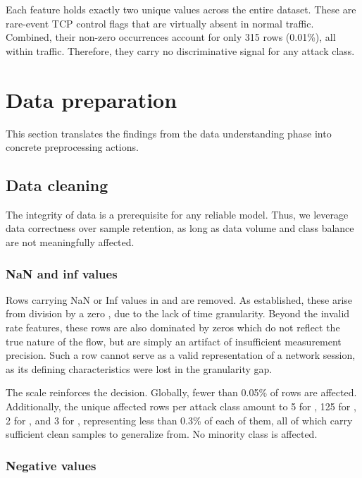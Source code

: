 Each feature holds exactly two unique values across the entire dataset. These are rare-event TCP control flags that are virtually absent in normal traffic. Combined, their non-zero occurrences account for only 315 rows (0.01\%), all within  traffic. Therefore, they carry no discriminative signal for any attack class.
\vspace{-0.5cm}
\section{Data preparation}
\vspace{-0.3cm}
This section translates the findings from the data understanding phase into concrete preprocessing actions.

\vspace{-0.5cm}
\subsection{Data cleaning}
\vspace{-0.3cm}
The integrity of data is a prerequisite for any reliable model. Thus, we leverage data correctness over sample retention, as long as data volume and class balance are not meaningfully affected.

\subsubsection{NaN and inf values}

Rows carrying NaN or Inf values in  and  are removed. As established, these arise from division by a zero , due to the lack of time granularity. Beyond the invalid rate features, these rows are also dominated by zeros which do not reflect the true nature of the flow, but are simply an artifact of insufficient measurement precision. Such a row cannot serve as a valid representation of a network session, as its defining characteristics were lost in the granularity gap.

The scale reinforces the decision. Globally, fewer than 0.05\% of rows are affected. Additionally, the unique affected rows per attack class amount to 5 for , 125 for , 2 for , and 3 for , representing less than 0.3\% of each of them, all of which carry sufficient clean samples to generalize from. No minority class is affected.

\subsubsection{Negative values}

